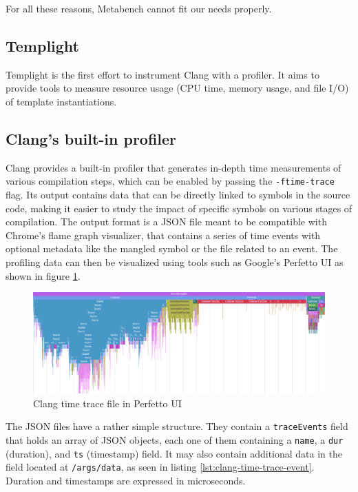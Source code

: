 \documentclass[../main]{subfiles}
\begin{document}
For all these reasons, Metabench cannot fit our needs properly.

\subsection{
  Templight
}

Templight \cite{templight} is the first effort to instrument Clang with a
profiler. It aims to provide tools to measure resource usage (CPU time,
memory usage, and file I/O) of template instantiations.


\subsection{
  Clang's built-in profiler
}

Clang provides a built-in profiler \cite{time-trace} that generates
in-depth time measurements of various compilation steps, which can be enabled by
passing the \lstinline{-ftime-trace} flag. Its output contains data that can be
directly linked to symbols in the source code, making it easier to study the
impact of specific symbols on various stages of compilation. The output format
is a JSON file meant to be compatible with Chrome's flame graph visualizer, that
contains a series of time events with optional metadata like the mangled \cpp
symbol or the file related to an event. The profiling data can then be
visualized using tools such as Google's Perfetto UI as shown in figure
\ref{fig:perfetto-time-trace-ui}.

\begin{figure}[h]
\includegraphics[scale=0.264]{images/perfetto-ui.png}
\caption{Clang time trace file in Perfetto UI}
\label{fig:perfetto-time-trace-ui}
\end{figure}

The JSON files have a rather simple structure. They contain a
\lstinline{traceEvents} field that holds an array of JSON objects, each one of
them containing a \lstinline{name}, a \lstinline{dur} (duration), and
\lstinline{ts} (timestamp) field. It may also contain additional data in the
field located at \lstinline{/args/data}, as seen in listing
\ref{lst:clang-time-trace-event}. Duration and timestamps are expressed in
microseconds.
\end{document}
